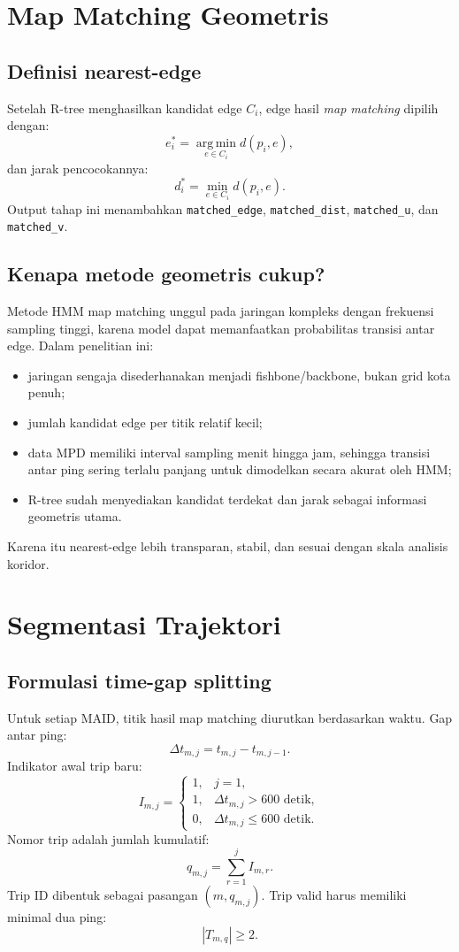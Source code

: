 \documentclass[11pt,a4paper]{article}
\newcommand{\argmin}{\operatorname*{arg\,min}}
\begin{document}
\section{Map Matching Geometris}
\subsection{Definisi nearest-edge}
Setelah R-tree menghasilkan kandidat edge $C_i$, edge hasil \textit{map matching} dipilih dengan:
\[
e_i^*=\argmin_{e\in C_i} d(p_i,e),
\]
dan jarak pencocokannya:
\[
d_i^*=\min_{e\in C_i}d(p_i,e).
\]
Output tahap ini menambahkan \texttt{matched\_edge}, \texttt{matched\_dist}, \texttt{matched\_u}, dan \texttt{matched\_v}.

\subsection{Kenapa metode geometris cukup?}
Metode HMM map matching unggul pada jaringan kompleks dengan frekuensi sampling tinggi, karena model dapat memanfaatkan probabilitas transisi antar edge. Dalam penelitian ini:
\begin{itemize}
    \item jaringan sengaja disederhanakan menjadi fishbone/backbone, bukan grid kota penuh;
    \item jumlah kandidat edge per titik relatif kecil;
    \item data MPD memiliki interval sampling menit hingga jam, sehingga transisi antar ping sering terlalu panjang untuk dimodelkan secara akurat oleh HMM;
    \item R-tree sudah menyediakan kandidat terdekat dan jarak sebagai informasi geometris utama.
\end{itemize}
Karena itu nearest-edge lebih transparan, stabil, dan sesuai dengan skala analisis koridor.

\section{Segmentasi Trajektori}
\subsection{Formulasi time-gap splitting}
Untuk setiap MAID, titik hasil map matching diurutkan berdasarkan waktu. Gap antar ping:
\[
\Delta t_{m,j}=t_{m,j}-t_{m,j-1}.
\]
Indikator awal trip baru:
\[
I_{m,j}=\begin{cases}
1, & j=1,\\
1, & \Delta t_{m,j}>600\text{ detik},\\
0, & \Delta t_{m,j}\leq600\text{ detik}.
\end{cases}
\]
Nomor trip adalah jumlah kumulatif:
\[
q_{m,j}=\sum_{r=1}^{j} I_{m,r}.
\]
Trip ID dibentuk sebagai pasangan $(m,q_{m,j})$. Trip valid harus memiliki minimal dua ping:
\[
|T_{m,q}|\geq2.
\]
\end{document}
